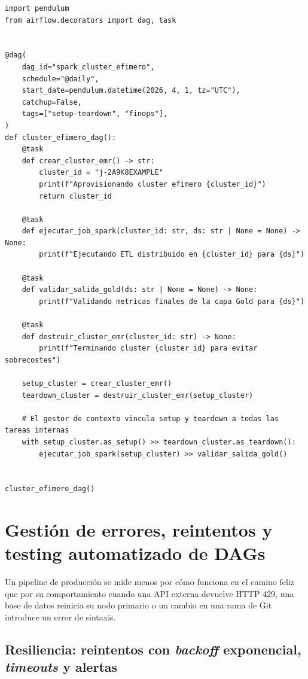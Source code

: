 \begin{lstlisting}[style=python, caption={Gestión segura de un clúster efímero con \code{as\_setup()} y \code{as\_teardown()}.}, label={lst:setup-teardown}]
import pendulum
from airflow.decorators import dag, task


@dag(
    dag_id="spark_cluster_efimero",
    schedule="@daily",
    start_date=pendulum.datetime(2026, 4, 1, tz="UTC"),
    catchup=False,
    tags=["setup-teardown", "finops"],
)
def cluster_efimero_dag():
    @task
    def crear_cluster_emr() -> str:
        cluster_id = "j-2A9K8EXAMPLE"
        print(f"Aprovisionando cluster efimero {cluster_id}")
        return cluster_id

    @task
    def ejecutar_job_spark(cluster_id: str, ds: str | None = None) -> None:
        print(f"Ejecutando ETL distribuido en {cluster_id} para {ds}")

    @task
    def validar_salida_gold(ds: str | None = None) -> None:
        print(f"Validando metricas finales de la capa Gold para {ds}")

    @task
    def destruir_cluster_emr(cluster_id: str) -> None:
        print(f"Terminando cluster {cluster_id} para evitar sobrecostes")

    setup_cluster = crear_cluster_emr()
    teardown_cluster = destruir_cluster_emr(setup_cluster)

    # El gestor de contexto vincula setup y teardown a todas las tareas internas
    with setup_cluster.as_setup() >> teardown_cluster.as_teardown():
        ejecutar_job_spark(setup_cluster) >> validar_salida_gold()


cluster_efimero_dag()
\end{lstlisting}

\section{Gestión de errores, reintentos y testing automatizado de DAGs}\label{sec:errores-testing}

Un pipeline de producción se mide menos por cómo funciona en el camino feliz que por su comportamiento cuando una API externa devuelve HTTP 429, una base de datos reinicia su nodo primario o un cambio en una rama de Git introduce un error de sintaxis.

\subsection{Resiliencia: reintentos con \textit{backoff} exponencial, \textit{timeouts} y alertas}

